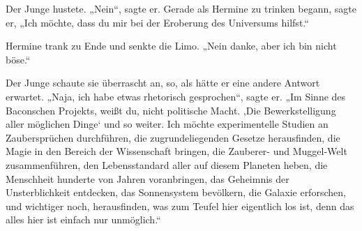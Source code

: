 Der Junge hustete.
„Nein“, sagte er. Gerade als Hermine zu trinken begann, sagte er,
„Ich möchte, dass du mir bei der Eroberung des Universums hilfst.“

Hermine trank zu Ende und senkte die Limo.
„Nein danke, aber ich bin nicht böse.“

Der Junge schaute sie überrascht an, so, als hätte er eine andere Antwort erwartet.
„Naja, ich habe etwas rhetorisch gesprochen“, sagte er.
„Im Sinne des Baconschen Projekts, weißt du, nicht politische Macht. ‚Die Bewerkstelligung aller möglichen Dinge‘ und so weiter. Ich möchte experimentelle Studien an Zaubersprüchen durchführen, die zugrundeliegenden Gesetze herausfinden, die Magie in den Bereich der Wissenschaft bringen, die Zauberer- und Muggel-Welt zusammenführen, den Lebensstandard aller auf diesem Planeten heben, die Menschheit hunderte von Jahren voranbringen, das Geheimnis der Unsterblichkeit entdecken, das Sonnensystem bevölkern, die Galaxie erforschen, und wichtiger noch, herausfinden, was zum Teufel hier eigentlich los ist, denn das alles hier ist einfach nur unmöglich.“%

